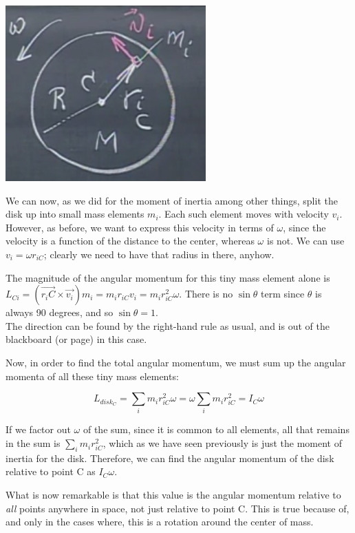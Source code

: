 \documentclass[8.01x]{subfiles}
\begin{document}
\begin{center}
\includegraphics[scale=0.7]{Graphics/lec20_spin_angular_momentum}
\end{center}

We can now, as we did for the moment of inertia among other things, split the disk up into small mass elements $m_i$. Each such element moves with velocity $v_i$. However, as before, we want to express this velocity in terms of $\omega$, since the velocity is a function of the distance to the center, whereas $\omega$ is not. We can use $v_i = \omega r_{iC}$; clearly we need to have that radius in there, anyhow.

The magnitude of the angular momentum for this tiny mass element alone is $L_{Ci} = (\vec{r_iC} \times \vec{v_i}) m_i = m_i r_{iC} v_i = m_i r_{iC}^2 \omega$. There is no $\sin \theta$ term since $\theta$ is always 90 degrees, and so $\sin \theta = 1$.\\
The direction can be found by the right-hand rule as usual, and is out of the blackboard (or page) in this case.

Now, in order to find the total angular momentum, we must sum up the angular momenta of all these tiny mass elements:

\begin{equation}
L_{disk_C} = \sum_i m_i r_{iC}^2 \omega = \omega \sum_i m_i r_{iC}^2 = I_C \omega
\end{equation}

If we factor out $\omega$ of the sum, since it is common to all elements, all that remains in the sum is $\sum_i m_i r_{iC}^2$, which as we have seen previously is just the moment of inertia for the disk. Therefore, we can find the angular momentum of the disk relative to point C as $I_C \omega$.

What is now remarkable is that this value is the angular momentum relative to \emph{all} points anywhere in space, not just relative to point C. This is true because of, and only in the cases where, this is a rotation around the center of mass.
\end{document}
